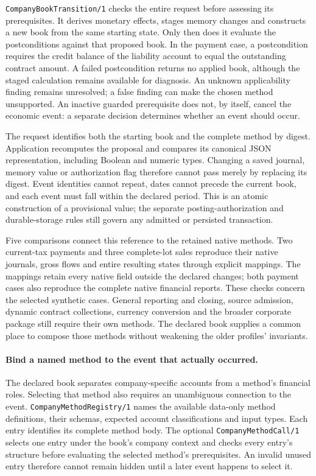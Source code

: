 \texttt{CompanyBookTransition/1} checks the entire request before assessing its
prerequisites. It derives monetary effects, stages memory changes and constructs
a new book from the same starting state. Only then does it evaluate the
postconditions against that proposed book. In the payment case, a postcondition
requires the credit balance of the liability account to equal the outstanding
contract amount. A failed postcondition returns no applied book, although the
staged calculation remains available for diagnosis. An unknown applicability
finding remains unresolved; a false finding can make the chosen method
unsupported. An inactive guarded prerequisite does not, by itself, cancel the
economic event: a separate decision determines whether an event should occur.

The request identifies both the starting book and the complete method by digest.
Application recomputes the proposal and compares its canonical JSON representation,
including Boolean and numeric types. Changing a saved journal, memory value or
authorization flag therefore cannot pass merely by replacing its digest. Event
identities cannot repeat, dates cannot precede the current book, and each event
must fall within the declared period. This is an atomic construction of a
provisional value; the separate posting-authorization and durable-storage rules
still govern any admitted or persisted transaction.

Five comparisons connect this reference to the retained native methods. Two
current-tax payments and three complete-lot sales reproduce their native journals,
gross flows and entire resulting states through explicit mappings. The mappings
retain every native field outside the declared changes; both payment cases also
reproduce the complete native financial reports. These checks concern the selected
synthetic cases. General reporting and closing, source admission, dynamic contract
collections, currency conversion and the broader corporate package still require
their own methods. The declared book supplies a common place to compose those
methods without weakening the older profiles' invariants.

\paragraph{Bind a named method to the event that actually occurred.}
The declared book separates company-specific accounts from a method's financial
roles. Selecting that method also requires an unambiguous connection to the event.
\texttt{CompanyMethodRegistry/1} names the available data-only method definitions,
their schemas, expected account classifications and input types. Each entry
identifies its complete method body. The optional \texttt{CompanyMethodCall/1}
selects one entry under the book's company context and checks every entry's
structure before evaluating the selected method's prerequisites. An invalid unused
entry therefore cannot remain hidden until a later event happens to select it.

